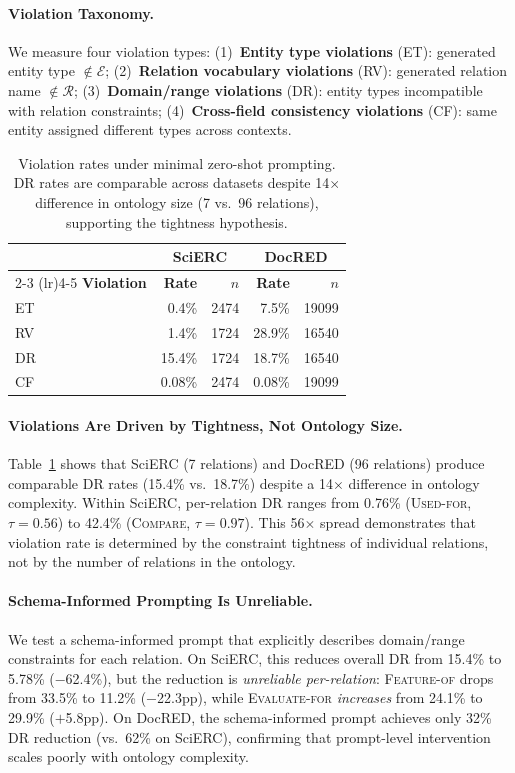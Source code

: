 \documentclass[11pt,a4paper]{article}
\newcommand{\dr}{DR}
\newcommand{\rv}{RV}
\newcommand{\et}{ET}
\newcommand{\cf}{CF}
\begin{document}
\paragraph{Violation Taxonomy.}
We measure four violation types:
(1)~\textbf{Entity type violations} (\et{}): generated entity type $\notin \mathcal{E}$;
(2)~\textbf{Relation vocabulary violations} (\rv{}): generated relation name $\notin \mathcal{R}$;
(3)~\textbf{Domain/range violations} (\dr{}): entity types incompatible with relation constraints;
(4)~\textbf{Cross-field consistency violations} (\cf{}): same entity assigned different types across contexts.

\begin{table}[t]
\centering
\small
\begin{tabular}{lrrrr}
\toprule
& \multicolumn{2}{c}{\textbf{SciERC}} & \multicolumn{2}{c}{\textbf{DocRED}} \\
\cmidrule(lr){2-3} \cmidrule(lr){4-5}
\textbf{Violation} & \textbf{Rate} & \textbf{$n$} & \textbf{Rate} & \textbf{$n$} \\
\midrule
ET & 0.4\% & 2474 & 7.5\% & 19099 \\
RV & 1.4\% & 1724 & 28.9\% & 16540 \\
DR & 15.4\% & 1724 & 18.7\% & 16540 \\
CF & 0.08\% & 2474 & 0.08\% & 19099 \\
\bottomrule
\end{tabular}
\caption{Violation rates under minimal zero-shot prompting. DR rates are comparable across datasets despite 14$\times$ difference in ontology size (7 vs.\ 96 relations), supporting the tightness hypothesis.}
\label{tab:violation-overview}
\end{table}

\paragraph{Violations Are Driven by Tightness, Not Ontology Size.}
Table~\ref{tab:violation-overview} shows that SciERC (7 relations) and DocRED (96 relations) produce comparable DR rates (15.4\% vs.\ 18.7\%) despite a 14$\times$ difference in ontology complexity.
Within SciERC, per-relation DR ranges from 0.76\% (\textsc{Used-for}, $\tau{=}0.56$) to 42.4\% (\textsc{Compare}, $\tau{=}0.97$).
This 56$\times$ spread demonstrates that violation rate is determined by the constraint tightness of individual relations, not by the number of relations in the ontology.

\paragraph{Schema-Informed Prompting Is Unreliable.}
We test a schema-informed prompt that explicitly describes domain/range constraints for each relation.
On SciERC, this reduces overall DR from 15.4\% to 5.78\% ($-$62.4\%), but the reduction is \emph{unreliable per-relation}: \textsc{Feature-of} drops from 33.5\% to 11.2\% ($-$22.3pp), while \textsc{Evaluate-for} \emph{increases} from 24.1\% to 29.9\% ($+$5.8pp).
On DocRED, the schema-informed prompt achieves only 32\% DR reduction (vs.\ 62\% on SciERC), confirming that prompt-level intervention scales poorly with ontology complexity.
\end{document}

